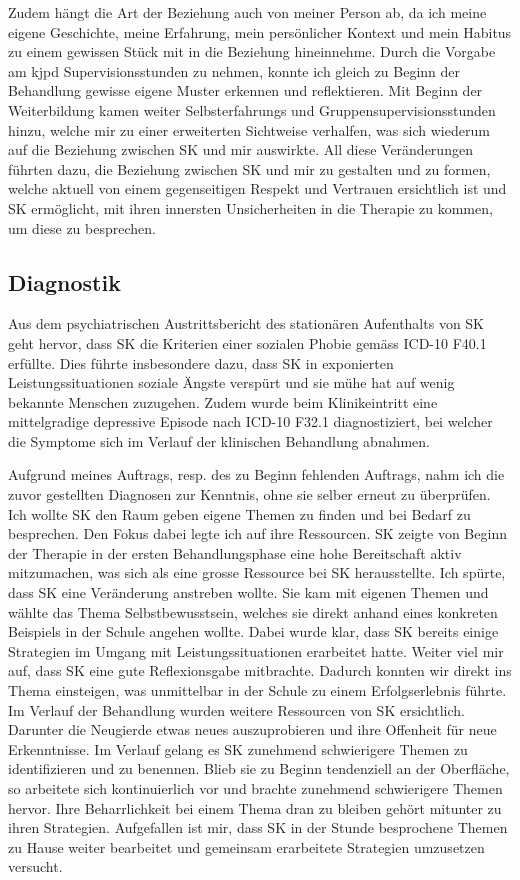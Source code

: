 Zudem hängt die Art der Beziehung auch von meiner Person ab, da ich meine eigene Geschichte, meine Erfahrung, mein persönlicher Kontext und mein Habitus zu einem gewissen Stück mit in die Beziehung hineinnehme. Durch die Vorgabe am \ac{kjpd} Supervisionsstunden zu nehmen, konnte ich gleich zu Beginn der Behandlung gewisse eigene Muster erkennen und reflektieren. Mit Beginn der Weiterbildung kamen weiter Selbsterfahrungs und Gruppensupervisionsstunden hinzu, welche mir zu einer erweiterten Sichtweise verhalfen, was sich wiederum auf die Beziehung zwischen SK und mir auswirkte. All diese Veränderungen führten dazu, die Beziehung zwischen SK und mir zu gestalten und zu formen, welche aktuell von einem gegenseitigen Respekt und Vertrauen ersichtlich ist und SK ermöglicht, mit ihren innersten Unsicherheiten in die Therapie zu kommen, um diese zu besprechen. 

 
\subsection{Diagnostik} 
Aus dem psychiatrischen Austrittsbericht des stationären Aufenthalts von SK geht hervor, dass SK die Kriterien einer sozialen Phobie gemäss ICD-10 F40.1 erfüllte. Dies führte insbesondere dazu, dass SK in exponierten Leistungssituationen soziale Ängste verspürt und sie mühe hat auf wenig bekannte Menschen zuzugehen. Zudem wurde beim Klinikeintritt eine mittelgradige depressive Episode nach ICD-10 F32.1 diagnostiziert, bei welcher die Symptome sich im Verlauf der klinischen Behandlung abnahmen. 

Aufgrund meines Auftrags, resp. des zu Beginn fehlenden Auftrags, nahm ich die zuvor gestellten Diagnosen zur Kenntnis, ohne sie selber erneut zu überprüfen. Ich wollte SK den Raum geben eigene Themen zu finden und bei Bedarf zu besprechen. Den Fokus dabei legte ich auf ihre Ressourcen. SK zeigte von Beginn der Therapie in der ersten Behandlungsphase eine hohe Bereitschaft aktiv mitzumachen, was sich als eine grosse Ressource bei SK herausstellte. Ich spürte, dass SK eine Veränderung anstreben wollte. Sie kam mit eigenen Themen und wählte das Thema Selbstbewusstsein, welches sie direkt anhand eines konkreten Beispiels in der Schule angehen wollte. Dabei wurde klar, dass SK bereits einige Strategien im Umgang mit Leistungssituationen erarbeitet hatte. Weiter viel mir auf, dass SK eine gute Reflexionsgabe mitbrachte. Dadurch konnten wir direkt ins Thema einsteigen, was unmittelbar in der Schule zu einem Erfolgserlebnis führte. Im Verlauf der Behandlung wurden weitere Ressourcen von SK ersichtlich. Darunter die Neugierde etwas neues auszuprobieren und ihre Offenheit für neue Erkenntnisse. Im Verlauf gelang es SK zunehmend schwierigere Themen zu identifizieren und zu benennen. Blieb sie zu Beginn tendenziell an der Oberfläche, so arbeitete sich kontinuierlich vor und brachte zunehmend schwierigere Themen hervor. Ihre Beharrlichkeit bei einem Thema dran zu bleiben gehört mitunter zu ihren Strategien. Aufgefallen ist mir, dass SK in der Stunde besprochene Themen zu Hause weiter bearbeitet und gemeinsam erarbeitete Strategien umzusetzen versucht.

